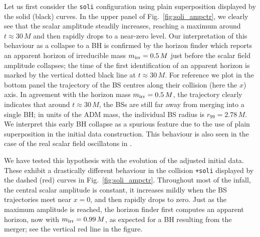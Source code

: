 \documentclass[]{iopart}
\newcommand{\us}[1]{\textcolor{teal}{[{\it\textbf{US: #1}}]} }
\renewcommand{\mr}[1]{\textcolor{purple}{[{\it\textbf{MR: #1}}]} }
\begin{document}
%
Let us first consider the {\tt soli} configuration using plain
superposition displayed by the solid (black) curves. In the upper
panel of Fig.~\ref{fig:soli_ampctr}, we clearly see
that the scalar amplitude steadily increases, reaching a maximum
around $t\approx 30\,M$ and then rapidly drops to a near-zero level.
Our interpretation of this behaviour as a collapse to a BH is confirmed
by the horizon finder which reports an apparent horizon of irreducible
mass $m_{\rm irr}=0.5\,M$ just before the scalar field amplitude
collapses; the time of the first identification of an apparent horizon
is marked by the vertical dotted black line at $t\approx 30\,M$.
For reference we plot in the bottom panel the trajectory of the BS centres
along their collision (here the $x$) axis. In agreement with the
horizon mass $m_{\rm irr}=0.5\,M$, the trajectory clearly indicates
that around $t\approx 30\,M$, the BSs are still far away from merging
into a single BH; in units of the ADM mass,
the individual BS radius is $r_{99}=2.78\,M$. We interpret
this early BH collapse as a spurious feature due to the use of
plain superposition in the initial data construction.
This behaviour is also seen in the case of the real scalar
field oscillatons in \cite{Helfer:2018vtq}.

We have tested this hypothesis with the evolution
of the adjusted initial data.
These exhibit a drastically different behaviour
in the collision {\tt +soli} displayed by the dashed (red) curves in
Fig.~\ref{fig:soli_ampctr}.
Throughout most of the infall, the central scalar amplitude
is constant, it increases mildly when the BS trajectories meet near $x=0$,
and then rapidly drops to zero. Just as the maximum amplitude is reached,
the horizon finder first computes an apparent horizon, now with 
$m_{\rm irr}=0.99\,M$, as expected for a BH resulting from the merger;
see the vertical red line in the figure.
\end{document}

